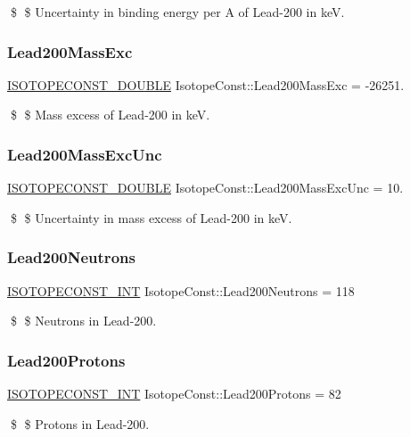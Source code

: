 \$ \$ Uncertainty in binding energy per A of Lead-\/200 in keV. \mbox{\label{group___isotope_const-_lead-_pb200_ga8f81b22fd1dad5e8eaa29cdbbfc7b217}} 
\subsubsection{\texorpdfstring{Lead200\+Mass\+Exc}{Lead200MassExc}}
{\footnotesize\ttfamily \mbox{\hyperlink{group___isotope_const-_macros_ga8f45a7272ce02c0b4c65c44636ed719a}{I\+S\+O\+T\+O\+P\+E\+C\+O\+N\+S\+T\+\_\+\+D\+O\+U\+B\+LE}} Isotope\+Const\+::\+Lead200\+Mass\+Exc = -\/26251.}

\$ \$ Mass excess of Lead-\/200 in keV. \mbox{\label{group___isotope_const-_lead-_pb200_ga83480ead5200af73ddaac493fe3dc3ac}} 
\subsubsection{\texorpdfstring{Lead200\+Mass\+Exc\+Unc}{Lead200MassExcUnc}}
{\footnotesize\ttfamily \mbox{\hyperlink{group___isotope_const-_macros_ga8f45a7272ce02c0b4c65c44636ed719a}{I\+S\+O\+T\+O\+P\+E\+C\+O\+N\+S\+T\+\_\+\+D\+O\+U\+B\+LE}} Isotope\+Const\+::\+Lead200\+Mass\+Exc\+Unc = 10.}

\$ \$ Uncertainty in mass excess of Lead-\/200 in keV. \mbox{\label{group___isotope_const-_lead-_pb200_ga95102249d33e3f8701bb3df91eb9dc78}} 
\subsubsection{\texorpdfstring{Lead200\+Neutrons}{Lead200Neutrons}}
{\footnotesize\ttfamily \mbox{\hyperlink{group___isotope_const-_macros_ga5f18360b3e99483a35c32d789e62621c}{I\+S\+O\+T\+O\+P\+E\+C\+O\+N\+S\+T\+\_\+\+I\+NT}} Isotope\+Const\+::\+Lead200\+Neutrons = 118}

\$ \$ Neutrons in Lead-\/200. \mbox{\label{group___isotope_const-_lead-_pb200_ga24808dd0f184cf84d37b9ae06f04b9c8}} 
\subsubsection{\texorpdfstring{Lead200\+Protons}{Lead200Protons}}
{\footnotesize\ttfamily \mbox{\hyperlink{group___isotope_const-_macros_ga5f18360b3e99483a35c32d789e62621c}{I\+S\+O\+T\+O\+P\+E\+C\+O\+N\+S\+T\+\_\+\+I\+NT}} Isotope\+Const\+::\+Lead200\+Protons = 82}

\$ \$ Protons in Lead-\/200. 